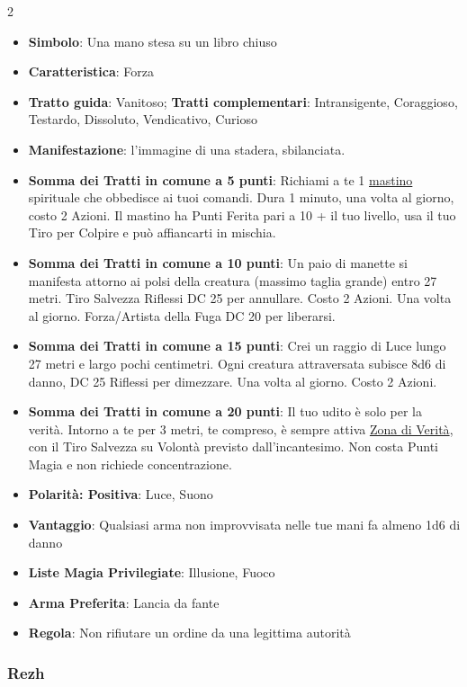 \begin{multicols}{2}
\begin{itemize}[leftmargin=*] \setlength{\itemsep}{0pt}
\item \textbf{Simbolo}: Una mano stesa su un libro chiuso
\item \textbf{Caratteristica}: Forza
\item \textbf{Tratto guida}: Vanitoso; \textbf{Tratti complementari}: Intransigente, Coraggioso, Testardo, Dissoluto, Vendicativo, Curioso
\item \textbf{Manifestazione}: l'immagine di una stadera, sbilanciata.
\item \textbf{Somma dei Tratti in comune a 5 punti}: Richiami a te 1 \hyperlink{Mastino}{mastino} spirituale che obbedisce ai tuoi comandi. Dura 1 minuto, una volta al giorno, costo 2 Azioni. Il mastino ha Punti Ferita pari a 10 + il tuo livello, usa il tuo Tiro per Colpire e può affiancarti in mischia.
\item \textbf{Somma dei Tratti in comune a 10 punti}: Un paio di manette si manifesta attorno ai polsi della creatura (massimo taglia grande) entro 27 metri. Tiro Salvezza Riflessi DC 25 per annullare. Costo 2 Azioni. Una volta al giorno. Forza/Artista della Fuga DC 20 per liberarsi.
\item \textbf{Somma dei Tratti in comune a 15 punti}: Crei un raggio di Luce lungo 27 metri e largo pochi centimetri. Ogni creatura attraversata subisce 8d6 di danno, DC 25 Riflessi per dimezzare. Una volta al giorno. Costo 2 Azioni.
\item \textbf{Somma dei Tratti in comune a 20 punti}: Il tuo udito è solo per la verità. Intorno a te per 3 metri, te compreso, è sempre attiva \hyperlink{Zona di Verità}{Zona di Verità}, con il Tiro Salvezza su Volontà previsto dall'incantesimo. Non costa Punti Magia e non richiede concentrazione.
\item \textbf{Polarità: Positiva}: Luce, Suono
\item \textbf{Vantaggio}: Qualsiasi arma non improvvisata nelle tue mani fa almeno 1d6 di danno
\item \textbf{Liste Magia Privilegiate}: Illusione, Fuoco
\item \textbf{Arma Preferita}: Lancia da fante
\item \textbf{Regola}: Non rifiutare un ordine da una legittima autorità
\end{itemize}

\subsubsection{Rezh}\label{rezh}\hypertarget{rezh}{}


\end{multicols}
